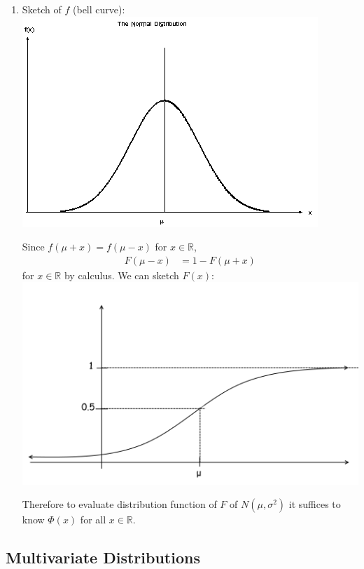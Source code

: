 \documentclass{article}
\newcommand{\R}{\mathbb{R}}
\begin{document}
\begin{itemize}
\begin{myrem*}{}{}
\begin{enumerate}
								\item Sketch of $f$ (bell curve):\\
								\includegraphics[scale=1]{normal.png}
								
								Since $f(\mu+x)=f(\mu-x)$ for $x\in\R$,
								\begin{align*}
									F(\mu-x)&=1-F(\mu+x)
								\end{align*}
								for $x\in\R$ by calculus. We can sketch $F(x)$:\\
								\includegraphics[scale=.5]{normaldist.png}
								
								Therefore to evaluate distribution function of $F$ of $N(\mu, \sigma^2)$ it suffices to know $\Phi(x)$ for all $x\in\R$.
							\end{enumerate}
						\end{myrem*}
					\end{itemize}
					
			\newpage
			\subsection{Multivariate Distributions}
\end{document}
